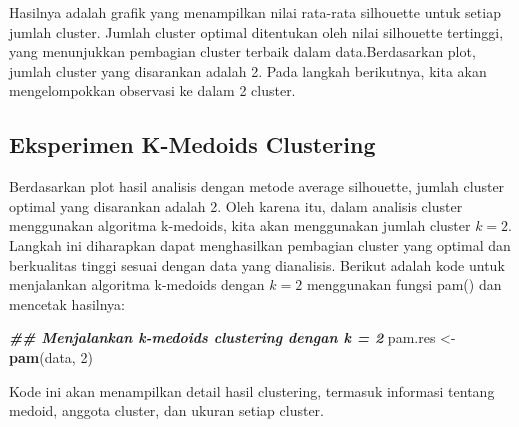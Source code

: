 \documentclass[
  oneside]{book}
\newenvironment{Shaded}{\begin{snugshade}}{\end{snugshade}}
\newcommand{\DecValTok}[1]{\textcolor[rgb]{0.00,0.00,0.81}{#1}}
\newcommand{\DocumentationTok}[1]{\textcolor[rgb]{0.56,0.35,0.01}{\textbf{\textit{#1}}}}
\newcommand{\FunctionTok}[1]{\textcolor[rgb]{0.13,0.29,0.53}{\textbf{#1}}}
\newcommand{\NormalTok}[1]{#1}
\newcommand{\OtherTok}[1]{\textcolor[rgb]{0.56,0.35,0.01}{#1}}
\begin{document}
Hasilnya adalah grafik yang menampilkan nilai rata-rata silhouette untuk setiap jumlah cluster. Jumlah cluster optimal ditentukan oleh nilai silhouette tertinggi, yang menunjukkan pembagian cluster terbaik dalam data.Berdasarkan plot, jumlah cluster yang disarankan adalah 2. Pada langkah berikutnya, kita akan mengelompokkan observasi ke dalam 2 cluster.

\subsection*{Eksperimen K-Medoids Clustering}\label{eksperimen-k-medoids-clustering}

Berdasarkan plot hasil analisis dengan metode average silhouette, jumlah cluster optimal yang disarankan adalah 2. Oleh karena itu, dalam analisis cluster menggunakan algoritma k-medoids, kita akan menggunakan jumlah cluster \(k = 2\). Langkah ini diharapkan dapat menghasilkan pembagian cluster yang optimal dan berkualitas tinggi sesuai dengan data yang dianalisis. Berikut adalah kode untuk menjalankan algoritma k-medoids dengan \(k = 2\) menggunakan fungsi pam() dan mencetak hasilnya:

\begin{Shaded}
\begin{Highlighting}[]
\DocumentationTok{\#\# Menjalankan k{-}medoids clustering dengan k = 2}
\NormalTok{pam.res }\OtherTok{\textless{}{-}} \FunctionTok{pam}\NormalTok{(data, }\DecValTok{2}\NormalTok{)}
\end{Highlighting}
\end{Shaded}

Kode ini akan menampilkan detail hasil clustering, termasuk informasi tentang medoid, anggota cluster, dan ukuran setiap cluster.
\end{document}
